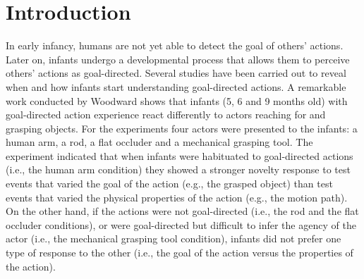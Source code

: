 \documentclass[conference]{IEEEtran}
\begin{document}
\section{Introduction}
In early infancy, humans are not yet able to detect the goal of others' actions. Later on, infants undergo a developmental process that allows them to perceive others' actions as goal-directed. Several studies have been carried out to reveal when and how infants start understanding goal-directed actions. A remarkable work conducted by Woodward \cite{woodward1998infants} shows that infants (5, 6 and 9 months old) with goal-directed action experience react differently to actors reaching for and grasping objects. For the experiments four actors were presented to the infants: a human arm, a rod, a flat occluder and a mechanical grasping tool. The experiment indicated that when infants were habituated to goal-directed actions (i.e., the human arm condition) they showed a stronger novelty response to test events that varied the goal of the action (e.g., the grasped object) than test events that varied the physical properties of the action (e.g., the motion path). On the other hand, if the actions were not goal-directed (i.e., the rod and the flat occluder conditions), or were goal-directed but difficult to infer the agency of the actor (i.e., the mechanical grasping tool condition), infants did not prefer one type of response to the other (i.e., the goal of the action versus the properties of the action).
\end{document}
